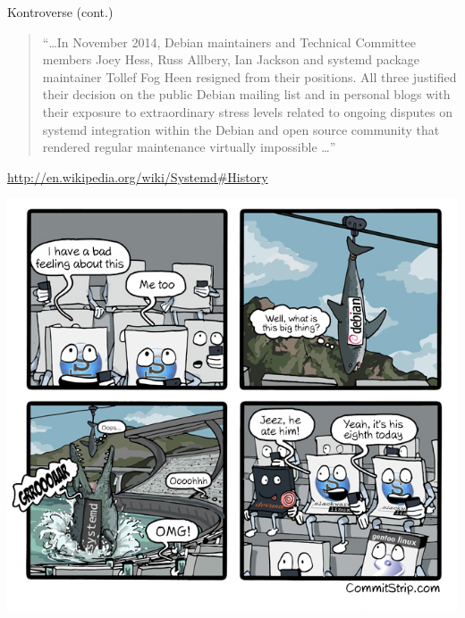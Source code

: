 \begin{frame}{Kontroverse (cont.)}
\begin{quote}
  ``\dots In November 2014, Debian maintainers and Technical Committee
  members Joey Hess, Russ Allbery, Ian Jackson and systemd package
  maintainer Tollef Fog Heen resigned from their positions. All three
  justified their decision on the public Debian mailing list and in
  personal blogs with their exposure to extraordinary stress levels
  related to ongoing disputes on systemd integration within the Debian
  and open source community that rendered regular maintenance virtually
  impossible \dots''

\end{quote}
\hfill{\footnotesize\url{http://en.wikipedia.org/wiki/Systemd\#History}}
\end{frame}


\begin{frame}[plain]
\vspace*{2ex}
\centerline{\includegraphics[height=\textheight]
  {files/Strip-SystmeD-650-finalenglish3.png}}
\end{frame}


